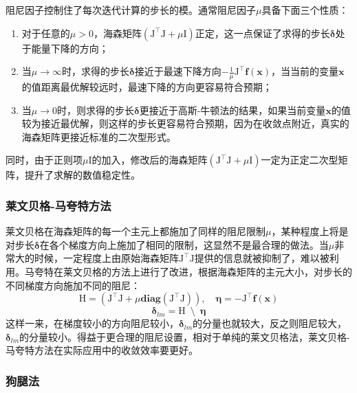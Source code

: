 阻尼因子控制住了每次迭代计算的步长的模。通常阻尼因子$\mu$具备下面三个性质\citep{tingleff2004methods}：
\begin{enumerate}
    \item 对于任意的$\mu>0$，海森矩阵$(\mathrm{J}^\top\mathrm{J}+\mu\mathrm{I})$正定，这一点保证了求得的步长$\bm{\delta}$处于能量下降的方向；
    \item 当$\mu\to\infty$时，求得的步长$\bm{\delta}$接近于最速下降方向$-\frac{1}{\mu}\mathrm{J}^\top\bm{f}(\bm{x})$，当当前的变量$\bm{x}$ 的值距离最优解较远时，最速下降的方向更容易符合预期；
    \item 当$\mu\to0$时，则求得的步长$\bm{\delta}$更接近于高斯-牛顿法的结果，如果当前变量$\bm{x}$的值较为接近最优解，则这样的步长更容易符合预期，因为在收敛点附近，真实的海森矩阵更接近标准的二次型形式。
\end{enumerate}
同时，由于正则项$\mu\mathrm{I}$的加入，修改后的海森矩阵$(\mathrm{J}^\top\mathrm{J}+\mu\mathrm{I})$一定为正定二次型矩阵，提升了求解的数值稳定性。

\subsubsection*{莱文贝格-马夸特方法}

莱文贝格在海森矩阵的每一个主元上都施加了同样的阻尼限制$\mu$，某种程度上将是对步长$\bm{\delta}$在各个梯度方向上施加了相同的限制，这显然不是最合理的做法。当$\mu$非常大的时候，一定程度上由原始海森矩阵$\mathrm{J}^\top\mathrm{J}$提供的信息就被抑制了，难以被利用。马夸特在莱文贝格的方法上进行了改进，根据海森矩阵的主元大小，对步长的不同梯度方向施加不同的阻尼：
\begin{equation}
    \mathrm{H} = \left( \mathrm{J}^\top\mathrm{J}+\mu\mathbf{diag}(\mathrm{J}^\top\mathrm{J}) \right), \quad
    \bm{\eta}  = -\mathrm{J}^\top\bm{f}(\bm{x})
\end{equation}
\begin{equation}
    \bm{\delta}_{lm} = \mathrm{H} \enspace\setminus\enspace \bm{\eta}
    \label{eq:lm}
\end{equation}
这样一来，在梯度较小的方向阻尼较小，$\bm{\delta}_{lm}$的分量也就较大，反之则阻尼较大，$\bm{\delta}_{lm}$的分量较小。得益于更合理的阻尼设置，相对于单纯的莱文贝格法，莱文贝格-马夸特方法在实际应用中的收敛效率要更好。

\subsubsection*{狗腿法}

